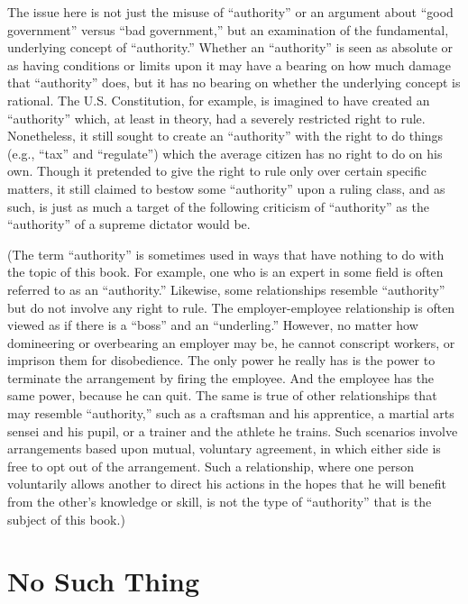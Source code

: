 \documentclass{book}
\begin{document}
The issue here is not just the misuse of \enquote{authority} or an argument about \enquote{good government} versus \enquote{bad government,} but an examination of the fundamental, underlying concept of \enquote{authority.} Whether an \enquote{authority} is seen as absolute or as having conditions or limits upon it may have a bearing on how much damage that \enquote{authority} does, but it has no bearing on whether the underlying concept is rational. The U.S. Constitution, for example, is imagined to have created an \enquote{authority} which, at least in theory, had a severely restricted right to rule. Nonetheless, it still sought to create an \enquote{authority} with the right to do things (e.g., \enquote{tax} and \enquote{regulate}) which the average citizen has no right to do on his own. Though it pretended to give the right to rule only over certain specific matters, it still claimed to bestow some \enquote{authority} upon a ruling class, and as such, is just as much a target of the following criticism of \enquote{authority} as the \enquote{authority} of a supreme dictator would be.

(The term \enquote{authority} is sometimes used in ways that have nothing to do with the topic of this book. For example, one who is an expert in some field is often referred to as an \enquote{authority.} Likewise, some relationships resemble \enquote{authority} but do not involve any right to rule. The employer-employee relationship is often viewed as if there is a \enquote{boss} and an \enquote{underling.} However, no matter how domineering or overbearing an employer may be, he cannot conscript workers, or imprison them for disobedience. The only power he really has is the power to terminate the arrangement by firing the employee. And the employee has the same power, because he can quit. The same is true of other relationships that may resemble \enquote{authority,} such as a craftsman and his apprentice, a martial arts sensei and his pupil, or a trainer and the athlete he trains. Such scenarios involve arrangements based upon mutual, voluntary agreement, in which either side is free to opt out of the arrangement. Such a relationship, where one person voluntarily allows another to direct his actions in the hopes that he will benefit from the other's knowledge or skill, is not the type of \enquote{authority} that is the subject of this book.)

\section{No Such Thing}
\end{document}
